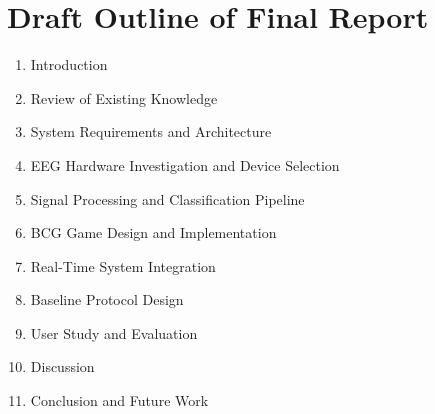 \documentclass[a4paper, 11pt, openany]{report}
\begin{document}
    \section{Draft Outline of Final Report}
    \begin{enumerate}
        \item Introduction
        \item Review of Existing Knowledge
        \item System Requirements and Architecture
        \item EEG Hardware Investigation and Device Selection
        \item Signal Processing and Classification Pipeline
        \item BCG Game Design and Implementation
        \item Real-Time System Integration
        \item Baseline Protocol Design
        \item User Study and Evaluation
        \item Discussion
        \item Conclusion and Future Work
    \end{enumerate}
\end{document}
